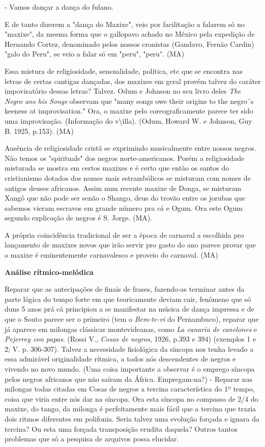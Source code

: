 - Vamos dançar a dança do fulano.

E de tanto dizerem a "dança do Maxixe", veio por facilitação a falarem
só no "maxixe", da mesma forma que o gallopavo achado no México pela
expedição de Hernando Cortez, denominado pelos nossos cronistas
(Gandavo, Fernão Cardin) "galo do Peru", se veio a falar só em "peru",
"peru". (MA)

Essa mistura de religiosidade, sensualidade, política, etc que se
encontra nas letras de certas cantigas dançadas, dos maxixes em geral
provém talvez do caráter impovisatório dessas letras? Talvez. Odum e
Johnson no seu livro deles \emph{The Negro ans his Songs} observam que
"many songs owe their origins to the negro´s keeness at improvisation."
Ora, o maxixe pelo coreograficamente parece ter sido uma improvisação.
(Informação do v\textbackslash{}illa). (Odum, Howard W. e Johnson, Guy
B. 1925, p.153). (MA)

Ausência de religiosidade cristã se exprimindo musicalmente entre nossos
negros. Não temos os "spirituals" dos negros norte-americanos. Porém a
religiosidade misturada se mostra em certos maxixes e é certo que então
os santos do cristianismo dotados dos nomes mais estrambólicos se
misturam com nomes de antigos deuses africanos. Assim num recente maxixe
de Donga, se misturam Xangô que não pode ser senão o Shango, deus do
trovão entre os jorubas que sabemos vieram escravos em grande número pra
cá e Ogum. Ora este Ogum segundo explicação de negros é S. Jorge. (MA).

A própria coincidência tradicional de ser a época de carnaval a
escolhida pro lançamento de maxixes novos que irão servir pro gasto do
ano parece provar que o maxixe é eminentemente carnavalesco e proveio do
carnaval. (MA)

\textbf{Análise rítmico-melódica}

Reparar que as antecipações de finais de frases, fazendo-as terminar
antes da parte lógica do tempo forte em que teoricamente deviam cair,
fenômeno que só duns 5 anos prá cá principiou a se manifestar na música
de dança impressa e de que o Souto parece ser o primeiro (tem o
\emph{Bem-te-vi} do Pernambuco), reparar que já aparece em milongas
clássicas montevideanas, como \emph{La canaria de canelones} e
\emph{Pejerrey con papas}. (Rossi V., \emph{Cosas de negros}, 1926,
p.393 e 394) (exemplos 1 e 2; V. p. 306-307). Talvez a necessidade
fisiológica da síncopa nos tenha levado a essa admirável originalidade
rítmica, a todos nós descendentes de negros e vivendo no novo mundo.
(Uma coisa importante a observar é o emprego síncopa pelos negros
africanos que não saíram da África. Empregam-na?) - Reparar nas milongas
todas citadas em Cosas de negros a tercina característica do 1º tempo,
coisa que viria entre nós dar na síncopa. Ora esta síncopa no compasso
de 2/4 do maxixe, do tango, da milonga é perfeitamente mais fácil que a
tercina que trazia dois ritmos diferentes em polifonia. Seria talvez uma
evolução forçada e ignara da tercina? Ou esta uma forçada transposição
erudita daquela? Outros tantos problemas que só a pesquisa de arquivos
possa elucidar.

